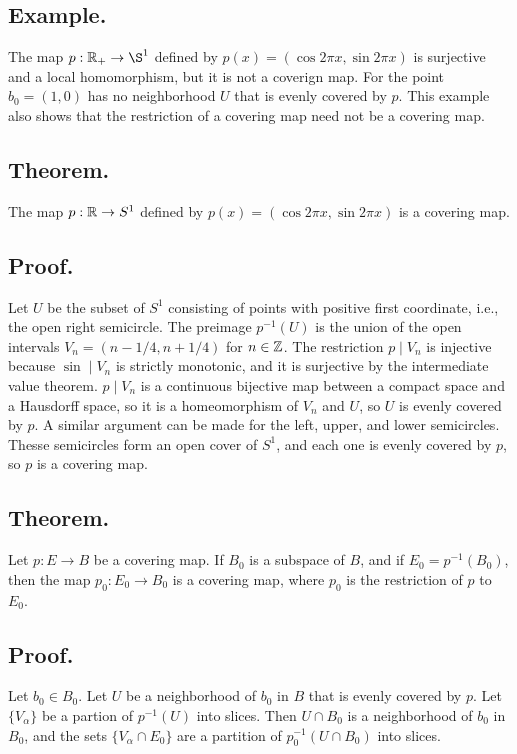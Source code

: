 \documentclass[titlepage]{article}
\begin{document}
\subsection{Example.} The map $p: \R_{+} \to \S^{1}$ defined by $p(x) = (\cos 2\pi x, \sin 2\pi x)$ is surjective and a local homomorphism, but it is not a coverign map. For the point $b_{0} = (1, 0)$ has no neighborhood $U$ that is evenly covered by $p$. This example also shows that the restriction of a covering map need not be a covering map.

\subsection{Theorem.} The map $p: \mathbb{R} \to S^{1}$ defined by $p(x) = (\cos 2\pi x, \sin 2\pi x)$ is a covering map.

\subsection{Proof.} Let $U$ be the subset of $S^{1}$ consisting of points with positive first coordinate, i.e., the open right semicircle. The preimage $p^{-1}(U)$ is the union of the open intervals $V_{n} = (n-1/4, n+1/4)$ for $n \in \mathbb{Z}$. The restriction $p \mid V_{n}$ is injective because $\sin \mid V_{n}$ is strictly monotonic, and it is surjective by the intermediate value theorem. $p \mid V_{n}$ is a continuous bijective map between a compact space and a Hausdorff space, so it is a homeomorphism of $V_{n}$ and $U$, so $U$ is evenly covered by $p$. A similar argument can be made for the left, upper, and lower semicircles. Thesse semicircles form an open cover of $S^{1}$, and each one is evenly covered by $p$, so $p$ is a covering map.

\subsection{Theorem.} Let $p: E \to B$ be a covering map. If $B_{0}$ is a subspace of $B$, and if $E_{0} = p^{-1}(B_{0})$, then the map $p_{0}: E_{0} \to B_{0}$ is a covering map, where $p_{0}$ is the restriction of $p$ to $E_{0}$.

\subsection{Proof.} Let $b_{0} \in B_{0}$. Let $U$ be a neighborhood of $b_{0}$ in $B$ that is evenly covered by $p$. Let $\{V_{\alpha}\}$ be a partion of $p^{-1}(U)$ into slices. Then $U \cap B_{0}$ is a neighborhood of $b_{0}$ in $B_{0}$, and the sets $\{V_{\alpha} \cap E_{0}\}$ are a partition of $p_{0}^{-1}(U \cap B_{0})$ into slices.
\end{document}
